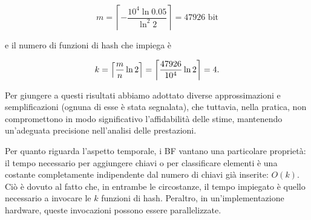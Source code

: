 \begin{equation}
    m = \left\lceil - \frac{10^4 \ln 0.05}{\ln^2 2} \right\rceil = 47926 \text{ bit}
\end{equation}

\noindent e il numero di funzioni di hash che impiega è

\begin{equation}
    k = \left\lceil \frac{m}{n} \ln 2 \right\rceil = \left\lceil \frac{47926}{10^4} \ln 2 \right\rceil = 4 \space .
\end{equation}

Per giungere a questi risultati abbiamo adottato diverse approssimazioni e semplificazioni (ognuna di esse è stata segnalata), che tuttavia, nella pratica, non compromettono in modo significativo l'affidabilità delle stime, mantenendo un'adeguata precisione nell'analisi delle prestazioni.

Per quanto riguarda l'aspetto temporale, i BF vantano una particolare proprietà: il tempo necessario per aggiungere chiavi o per classificare elementi è una costante completamente indipendente dal numero di chiavi già inserite: $O(k)$. Ciò è dovuto al fatto che, in entrambe le circostanze, il tempo impiegato è quello necessario a invocare le $k$ funzioni di hash. Peraltro, in un'implementazione hardware, queste invocazioni possono essere parallelizzate.